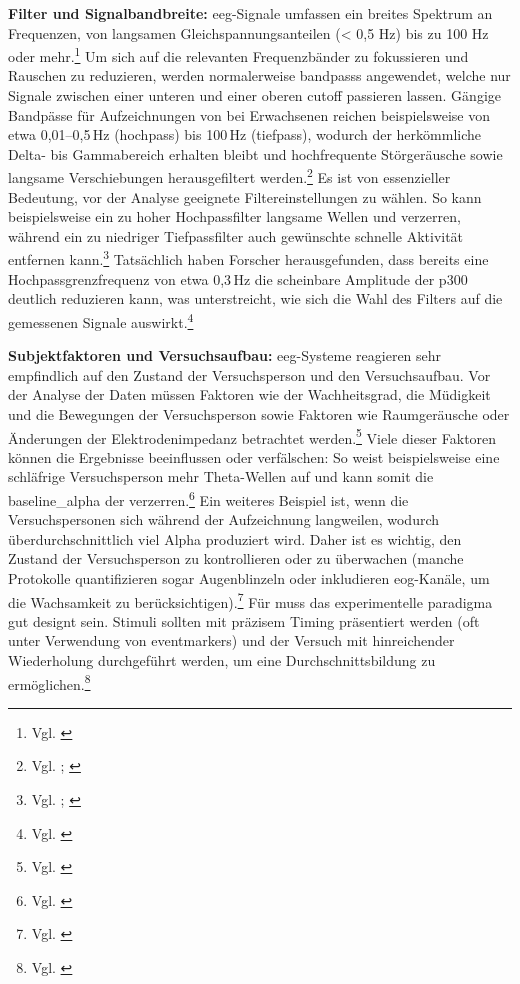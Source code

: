 \textbf{Filter und Signalbandbreite:} \acrshort{eeg}-Signale umfassen ein breites Spektrum an Frequenzen, von langsamen Gleichspannungsanteilen (< 0,5 Hz) bis zu 100 Hz oder mehr.\footnote{Vgl. \cite{nayak_waveforms}} Um sich auf die relevanten Frequenzbänder zu fokussieren und Rauschen zu reduzieren, werden normalerweise \glspl{bandpass} angewendet, welche nur Signale zwischen einer unteren und einer oberen \gls{cutoff} passieren lassen. Gängige Bandpässe für Aufzeichnungen von  bei Erwachsenen reichen beispielsweise von etwa 0,01--0,5\,Hz (\gls{hochpass}) bis 100\,Hz (\gls{tiefpass}), wodurch der herkömmliche Delta- bis Gammabereich erhalten bleibt und hochfrequente Störgeräusche sowie langsame Verschiebungen herausgefiltert werden.\footnote{Vgl. \cite{light2010}; \cite{tanner2015_highpass}} Es ist von essenzieller Bedeutung, vor der Analyse geeignete Filtereinstellungen zu wählen. So kann beispielsweise ein zu hoher Hochpassfilter langsame Wellen und  verzerren, während ein zu niedriger Tiefpassfilter auch gewünschte schnelle Aktivität entfernen kann.\footnote{Vgl. \cite[S.~2]{widmann2012_filter}; \cite[S.~1]{muthukumaraswamy2013}} Tatsächlich haben Forscher herausgefunden, dass bereits eine Hochpassgrenzfrequenz von etwa 0,3\,Hz die scheinbare Amplitude der \gls{p300} deutlich reduzieren kann, was unterstreicht, wie sich die Wahl des Filters auf die gemessenen Signale auswirkt.\footnote{Vgl. \cite{tanner2015_highpass}}

\textbf{Subjektfaktoren und Versuchsaufbau:} \acrshort{eeg}-Systeme reagieren sehr empfindlich auf den Zustand der Versuchsperson und den Versuchsaufbau. Vor der Analyse der Daten müssen Faktoren wie der Wachheitsgrad, die Müdigkeit und die Bewegungen der Versuchsperson sowie Faktoren wie Raumgeräusche oder Änderungen der Elektrodenimpedanz betrachtet werden.\footnote{Vgl. \cite[S.~890]{kappenman2010}} Viele dieser Faktoren können die Ergebnisse beeinflussen oder verfälschen: So weist beispielsweise eine schläfrige Versuchsperson mehr Theta-Wellen auf und kann somit die \gls{baseline_alpha} der  verzerren.\footnote{Vgl. \cite{nayak_waveforms}} Ein weiteres Beispiel ist, wenn die Versuchspersonen sich während der Aufzeichnung langweilen, wodurch überdurchschnittlich viel Alpha produziert wird. Daher ist es wichtig, den Zustand der Versuchsperson zu kontrollieren oder zu überwachen (manche Protokolle quantifizieren sogar Augenblinzeln oder inkludieren \acrshort{eog}-Kanäle, um die Wachsamkeit zu berücksichtigen).\footnote{Vgl. \cite{nayak_waveforms}} Für  muss das experimentelle \gls{paradigma} gut designt sein. Stimuli sollten mit präzisem Timing präsentiert werden (oft unter Verwendung von \glspl{eventmarker}) und der Versuch mit hinreichender Wiederholung durchgeführt werden, um eine Durchschnittsbildung zu ermöglichen.\footnote{Vgl. \cite{light2010}}

